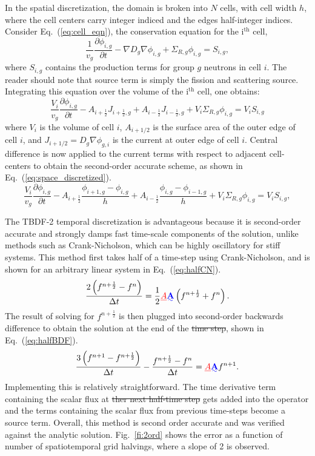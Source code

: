 \documentclass{style/nseJournal}
\newcommand{\fn}[1]{\left( #1 \right)}
\newcommand{\dxdt}[1]{\frac{\partial #1}{\partial t}}
\newcommand{\be}{\begin{equation}}
\newcommand{\ee}{\end{equation}}
\newcommand{\LEQ}[1]{\label{eq:#1}}
\newcommand{\EQ}[1]{Eq.~(\ref{eq:#1})}
\newcommand{\FI}[1]{Fig.~\ref{fi:#1}}
\newcommand{\half}{\frac{1}{2}}
\newcommand{\mA}{\mathbf{A}}
\providecommand{\DIFadd}[1]{{\protect\color{blue}\uwave{#1}}} %
\providecommand{\DIFdel}[1]{{\protect\color{red}\sout{#1}}}                      %
\providecommand{\DIFaddbegin}{} %
\providecommand{\DIFaddend}{} %
\providecommand{\DIFdelbegin}{} %
\providecommand{\DIFdelend}{} %
\begin{document}
In the spatial discretization, the domain is broken into $N$ cells, with cell width $h$, where the cell centers carry integer indiced and the edges half-integer indices.  
Consider \EQ{cell_eqn}, the conservation equation for the i$^{\text{th}}$ cell,
\be
	\frac{1}{v_g} \dxdt{\phi_{i,g}} - \nabla D_{g} \nabla \phi_{i,g} + 	
	\Sigma_{R,g} \phi_{i,g}  =  S_{i,g},
	\LEQ{cell_eqn} 
\ee
where $S_{i,g}$ contains the production terms for group $g$ neutrons in cell $i$.  
The reader should note that \DIFaddbegin \DIFadd{the }\DIFaddend source term is simply the fission and 
scattering source.  
Integrating this equation over the volume of the i$^{\text{th}}$ cell, one obtains:
\be
	\frac{V_i}{v_g} \dxdt{\phi_{i,g}} - A_{i+\half} J_{i+\half,g} + A_{i-\half} 
	J_{i-\half,g} + V_i \Sigma_{R,g} \phi_{i,g} = V_i S_{i,g}
\ee
where $V_i $ is the volume of cell $i$, $ A_{i+1/2} $ is the surface area of the outer edge of cell $i$, and $ J_{i+1/2} = D_g \nabla \phi_{g,i} $ is the current at outer edge of cell $i$.  
Central difference is now applied to the current terms with respect to adjacent cell-centers to obtain the second-order accurate scheme, as shown in \EQ{space_discretized}.  
\be
	\frac{V_i}{v_g} \dxdt{\phi_{i,g}} - A_{i+\half} \frac{\phi_{i+1,g} - \phi_{i,g}}{h} + A_{i-\half} \frac{\phi_{i,g} 
		- \phi_{i-1,g}}{h} + V_i \Sigma_{R,g} \phi_{i,g} = V_i S_{i,g},
	\LEQ{space_discretized} 
\ee

The TBDF-2 temporal discretization is advantageous because it is second-order accurate and strongly damps fast time-scale components of the solution, unlike methods such as Crank-Nicholson, which can be highly oscillatory for stiff systems.  
This method first takes half of a time-step using Crank-Nicholson, and is shown for an arbitrary linear system in \EQ{halfCN}.  
\be
	\frac{2 \fn{ f^{n+\half} - f^n }}{\Delta t} =  \half \DIFdelbegin \DIFdel{A }\DIFdelend \DIFaddbegin \DIFadd{\mA }\DIFaddend \fn{f^{n+\half} + 
	f^n}.
	\LEQ{halfCN} 
\ee
The result of solving for $f^{n+\half}$ is then plugged into second-order 
backwards difference to obtain the solution at the end of the \DIFdelbegin \DIFdel{time step}\DIFdelend \DIFaddbegin \DIFadd{time-step}\DIFaddend , shown 
in \EQ{halfBDF}.  
\be
	\frac{3 \fn{ f^{n+1} - f^{n+\half} }}{\Delta t} - \frac{f^{n+\half} - 
		f^n}{\Delta t} = \DIFdelbegin \DIFdel{A }\DIFdelend \DIFaddbegin \DIFadd{\mA }\DIFaddend f^{n+1}.
	\LEQ{halfBDF} 
\ee 
Implementing this is relatively straightforward. 
The time derivative term containing the scalar flux at \DIFdelbegin \DIFdel{ther next half-time step }\DIFdelend \DIFaddbegin \DIFadd{the next half time-step 
}\DIFaddend gets added into the operator and the terms containing the scalar flux from 
previous time-steps become a source term.  
Overall, this method is second order accurate and was verified against the analytic solution.  
\FI{2ord} shows the error as a function of number of spatiotemporal grid 
halvings, where a slope of 2 is observed.
\DIFaddbegin 
\end{document}
